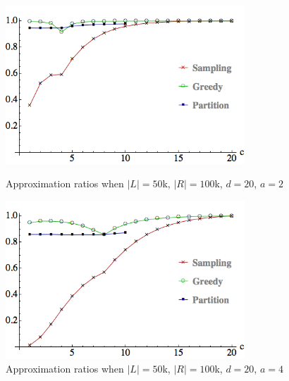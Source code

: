 \begin{figure}[t]
\centering
\begin{minipage}[h]{0.45\textwidth}
\centering
\includegraphics[width=0.8\textwidth]{images/l=50000,r=100000,a=2_Greedy_vs_Naive.png}
\caption{Approximation ratios when $|L|=50$k, $|R|=100$k, $d=20$, $a=2$}\label{fig:a=2}
\end{minipage}
\hspace{0.2cm}
\begin{minipage}[h]{0.45\textwidth}
\centering
\includegraphics[width=0.8\textwidth]{images/l=50000,r=100000,a=4_Greedy_vs_Naive.png}
\caption{Approximation ratios when $|L|=50$k, $|R|=100$k, $d=20$, $a=4$}\label{fig:a=4}
\end{minipage}
\end{figure}
